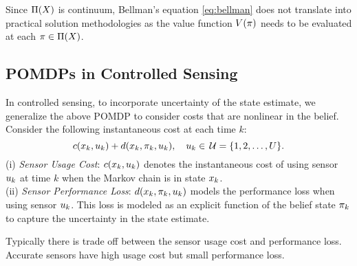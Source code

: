 \documentclass[draftcls,onecolumn]{IEEEtran}
\begin{document}
Since  $\Pi(X)$ is continuum, Bellman's equation \eqref{eq:bellman} does not translate into practical solution methodologies as  the value function $V(\pi)$ needs to be evaluated at each $\pi \in \Pi(X)$. 


\subsection{POMDPs in Controlled Sensing}
In controlled sensing, to incorporate
 uncertainty of  the state estimate, we generalize the above POMDP to consider costs that are nonlinear in the belief.
Consider the following   instantaneous cost at each time $k$:
 $$ c(x_k,u_k) + d(x_k,\pi_k,u_k), \quad u_k \in \,\mathcal{U} = \{1,2,\ldots,U\}. $$
  (i) {\em Sensor Usage Cost}:
$c(x_k,u_k)$ denotes the instantaneous cost of using sensor  $u_k$  at time $k$ when the
 Markov chain is in state $x_k$. \\
 (ii) {\em Sensor Performance Loss}:  $d(x_k,\pi_k,u_k)$ models the
performance loss when using sensor $u_k$.  This loss is modeled as an  explicit function of the belief state $\pi_k$  to capture the uncertainty in the state estimate. %

Typically there is trade off between the sensor usage cost and performance loss.
 Accurate sensors have high usage cost but small performance loss.
\end{document}
